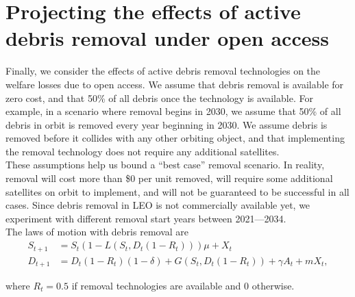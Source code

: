\documentclass[12pt]{article}
\begin{document}
\section{Projecting the effects of active debris removal under open access}

Finally, we consider the effects of active debris removal technologies on the welfare losses due to open access. We assume that debris removal is available for zero cost, and that 50\% of all debris  once the technology is available. For example, in a scenario where removal begins in 2030, we assume that 50\% of all debris in orbit is removed every year beginning in 2030. We assume debris is removed before it collides with any other orbiting object, and that implementing the removal technology does not require any additional satellites. \\

These assumptions help us bound a ``best case'' removal scenario. In reality, removal will cost more than \$0 per unit removed, will require some additional satellites on orbit to implement, and will not be guaranteed to be successful in all cases. Since debris removal in LEO is not commercially available yet, we experiment with different removal start years between 2021---2034.\\

The laws of motion with debris removal are
\begin{align}
\label{satelliteLoM_rem}
S_{t+1} &= S_t(1 - L(S_t,D_t(1-R_t)))\mu + X_t \\
\label{debrisLoM_rem}
D_{t+1} &= D_t(1-R_t)(1-\delta) + G(S_t,D_t(1-R_t)) + \gamma A_t + mX_t,
\end{align}

where $R_t = 0.5$ if removal technologies are available and $0$ otherwise.  \\
\end{document}
